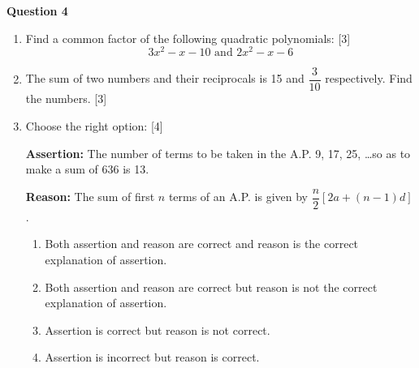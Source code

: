 \noindent
\textbf{Question 4}
\begin{enumerate}[label=(\roman*)]

    \item Find a common factor of the following quadratic polynomials:
        \hfill [3]
        \[
            3x^2 - x - 10 \text{ and } 2x^2 - x - 6 
        \]

    \item The sum of two numbers and their reciprocals
        is 15 and $\dfrac{3}{10}$ respectively. Find the numbers. \hfill [3]

    \item Choose the right option: \hfill [4]

        \textbf{Assertion:} The number of terms to be taken in the A.P.
        9, 17, 25, \dots so as to make a sum of 636 is 13.

        \textbf{Reason:} The sum of first $n$ terms of an A.P. is given 
        by $\dfrac{n}{2}[2a + (n-1)d]$.

        \begin{enumerate}[label={\alph*.}]
            \item Both assertion and reason are correct and reason is the
                correct explanation of assertion.
            \item Both assertion and reason are correct but reason is not
                the correct explanation of assertion.
            \item Assertion is correct but reason is not correct.
            \item Assertion is incorrect but reason is correct.
        \end{enumerate}

\end{enumerate}

